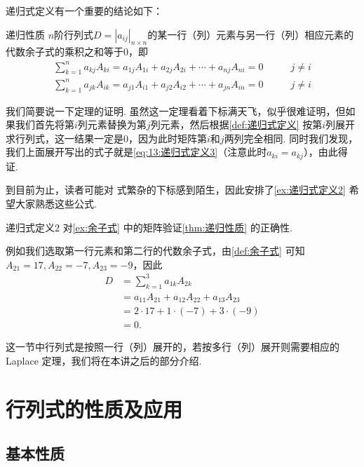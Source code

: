 递归式定义有一个重要的结论如下：
\begin{theorem}{}{递归性质}
    $n$阶行列式$D=|a_{ij}|_{n \times n}$的某一行（列）元素与另一行（列）相应元素的代数余子式的乘积之和等于0，即
    \begin{align}
        \label{eq:13:递归式定义3}
        \sum_{k=1}^{n}a_{kj}A_{ki}=a_{1j}A_{1i}+a_{2j}A_{2i}+\cdots+a_{nj}A_{ni}=0 & \qquad j \neq i \\
        \label{eq:13:递归式定义4}
        \sum_{k=1}^{n}a_{jk}A_{ik}=a_{j1}A_{i1}+a_{j2}A_{i2}+\cdots+a_{jn}A_{in}=0 & \qquad j \neq i
    \end{align}
\end{theorem}

我们简要说一下定理的证明. 虽然这一定理看着下标满天飞，似乎很难证明，但如果我们首先将第$i$列元素替换为第$j$列元素，然后根据\autoref{def:递归式定义} 按第$i$列展开求行列式，这一结果一定是0，因为此时矩阵第$i$和$j$两列完全相同. 同时我们发现，我们上面展开写出的式子就是\autoref{eq:13:递归式定义3}（注意此时$a_{ki}=a_{kj}$），由此得证.

到目前为止，读者可能对 式繁杂的下标感到陌生，因此安排了\autoref{ex:递归式定义2} 希望大家熟悉这些公式.

\begin{example}{}{递归式定义2}
    对\autoref{ex:余子式} 中的矩阵验证\autoref{thm:递归性质} 的正确性.
\end{example}

\begin{solution}
    例如我们选取第一行元素和第二行的代数余子式，由\autoref{def:余子式} 可知$A_{21}=17,A_{22}=-7,A_{23}=-9$，因此
    \begin{align*}
        D & =\sum_{k=1}^{3}a_{1k}A_{2k}             \\
          & =a_{11}A_{21}+a_{12}A_{22}+a_{13}A_{23} \\
          & =2 \cdot 17+1 \cdot (-7)+3 \cdot (-9)   \\
          & =0.
    \end{align*}
\end{solution}

这一节中行列式是按照一行（列）展开的，若按多行（列）展开则需要相应的 Laplace 定理，我们将在本讲之后的部分介绍.

\section{行列式的性质及应用}

\subsection{基本性质}

